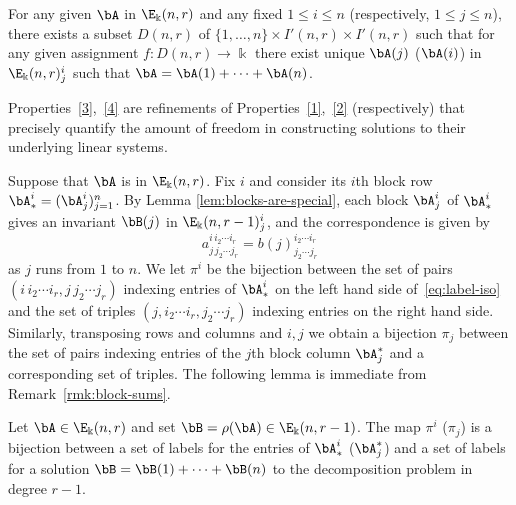 \begin{property}\label{4}
 For any given $\bA$ in $\E_\Bbbk(n,r)$ and any fixed $1\le i \le n$
 \textup{(}respectively, $1 \le j \le n$\textup{)}, there exists a
 subset $D(n,r)$ of $\{1, \dots, n\} \times I'(n,r) \times I'(n,r)$
 such that for any given assignment $f: D(n,r) \to \Bbbk$ there exist
 unique $\bA(j)$ \textup{(}\resp $\bA(i)$\textup{)} in
 $\E_\Bbbk(n,r)^i_j$ such that $\bA = \bA(1) + \cdots + \bA(n)$.
\end{property}

Properties~\ref{3},~\ref{4} are refinements of
Properties~\ref{1},~\ref{2} (respectively) that precisely quantify the
amount of freedom in constructing solutions to their underlying linear
systems.

Suppose that $\bA$ is in $\E_\Bbbk(n,r)$. Fix $i$ and consider its
$i$th block row $\bA^i_* = (\bA^i_j)_{j=1}^n$. By Lemma
\ref{lem:blocks-are-special}, each block $\bA^i_j$ of $\bA^i_*$ gives
an invariant $\bB(j)$ in $\E_\Bbbk(n,r-1)^i_j$, and the correspondence
is given by
\begin{equation}\label{eq:label-iso}
 a^{i\, i_2 \cdots i_r}_{j\,j_2 \cdots j_r} = b(j)^{i_2 \cdots i_r}_{j_2 \cdots j_r}
\end{equation}
as $j$ runs from $1$ to $n$. We let $\pi^i$ be the bijection between
the set of pairs $(i\, i_2 \cdots i_r, j\,j_2 \cdots j_r)$ indexing
entries of $\bA^i_*$ on the left hand side of~\eqref{eq:label-iso} and
the set of triples $(j, i_2 \cdots i_r, j_2 \cdots j_r)$ indexing
entries on the right hand side. Similarly, transposing rows and
columns and $i,j$ we obtain a bijection $\pi_j$ between the set of
pairs indexing entries of the $j$th block column $\bA^*_j$ and a
corresponding set of triples. The following lemma is immediate from
Remark~\ref{rmk:block-sums}.


\begin{lemm}\label{lem:bijections}
Let $\bA \in \E_\Bbbk(n,r)$ and set $\bB = \rho(\bA) \in
\E_\Bbbk(n,r-1)$. The map $\pi^i$ \textup{(}\resp $\pi_j$\textup{)}
is a bijection between a set of labels for the entries of $\bA^i_*$
\textup{(}\resp $\bA^*_j$\textup{)} and a set of labels for a solution
$\bB = \bB(1)+ \cdots + \bB(n)$ to the decomposition problem in degree
$r-1$.
\end{lemm}





